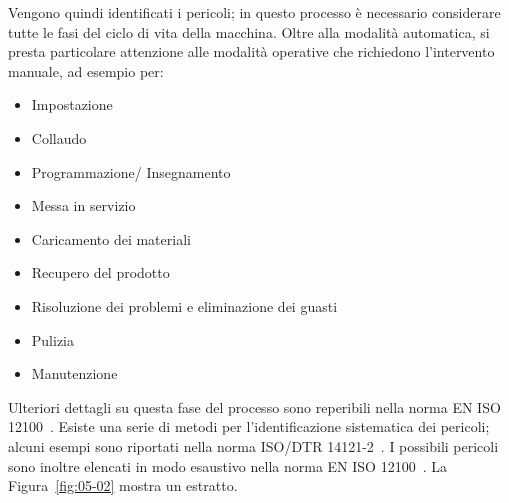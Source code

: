 Vengono quindi identificati i pericoli; in questo processo è necessario considerare tutte le fasi del ciclo di vita della macchina. Oltre alla modalità automatica, si presta particolare attenzione alle modalità operative che richiedono l'intervento manuale, ad esempio per:
\begin{itemize}
    \item Impostazione
    \item Collaudo
    \item Programmazione/ Insegnamento
    \item Messa in servizio
    \item Caricamento dei materiali
    \item Recupero del prodotto
    \item Risoluzione dei problemi e eliminazione dei guasti
    \item Pulizia
    \item Manutenzione
\end{itemize}
Ulteriori dettagli su questa fase del processo sono reperibili nella norma EN ISO 12100~\cite{eniso12100}. Esiste una serie di metodi per l'identificazione sistematica dei pericoli; alcuni esempi sono riportati nella norma ISO/DTR 14121-2~\cite{isotr14121-2}. I possibili pericoli sono inoltre elencati in modo esaustivo nella norma EN ISO 12100~\cite{eniso12100}. La Figura~\ref{fig:05-02} mostra un estratto.

